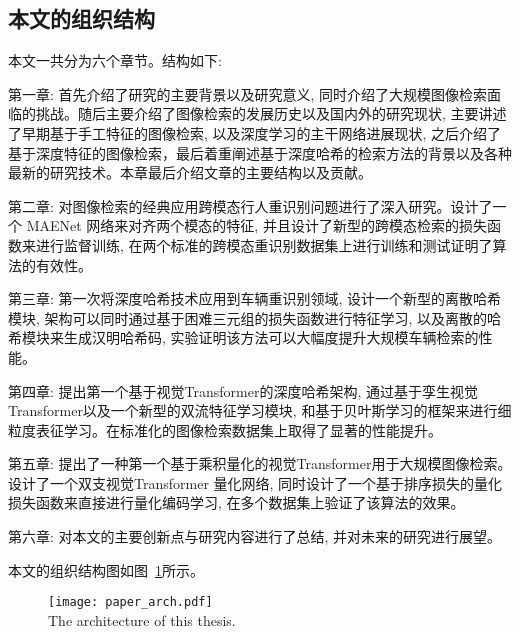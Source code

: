 \subsection{本文的组织结构}
本文一共分为六个章节。结构如下: \par
第一章: 首先介绍了研究的主要背景以及研究意义, 同时介绍了大规模图像检索面临的挑战。随后主要介绍了图像检索的发展历史以及国内外的研究现状, 主要讲述了早期基于手工特征的图像检索, 以及深度学习的主干网络进展现状, 之后介绍了基于深度特征的图像检索，最后着重阐述基于深度哈希的检索方法的背景以及各种最新的研究技术。本章最后介绍文章的主要结构以及贡献。 \par
第二章: 对图像检索的经典应用跨模态行人重识别问题进行了深入研究。设计了一个 MAENet 网络来对齐两个模态的特征, 并且设计了新型的跨模态检索的损失函数来进行监督训练, 在两个标准的跨模态重识别数据集上进行训练和测试证明了算法的有效性。 \par
第三章: 第一次将深度哈希技术应用到车辆重识别领域, 设计一个新型的离散哈希模块, 架构可以同时通过基于困难三元组的损失函数进行特征学习, 以及离散的哈希模块来生成汉明哈希码, 实验证明该方法可以大幅度提升大规模车辆检索的性能。 \par
第四章: 提出第一个基于视觉Transformer的深度哈希架构, 通过基于孪生视觉Transformer以及一个新型的双流特征学习模块, 和基于贝叶斯学习的框架来进行细粒度表征学习。在标准化的图像检索数据集上取得了显著的性能提升。 \par
第五章: 提出了一种第一个基于乘积量化的视觉Transformer用于大规模图像检索。设计了一个双支视觉Transformer 量化网络, 同时设计了一个基于排序损失的量化损失函数来直接进行量化编码学习, 在多个数据集上验证了该算法的效果。 \par
第六章: 对本文的主要创新点与研究内容进行了总结, 并对未来的研究进行展望。 \par 
本文的组织结构图如图~\ref{fig:overallarch}所示。
\begin{figure}[!htp]
    \centering
    \texttt{[image: paper\_arch.pdf]} \\
      {The architecture of this thesis.}
   \label{fig:overallarch}
\end{figure}